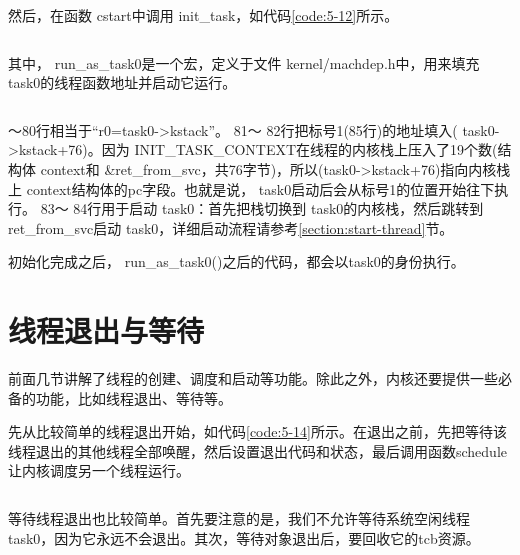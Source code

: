 \documentclass[main.tex]{subfiles}
\begin{document}
\begin{CJK*}{UTF8}{song}
\noindent
然后，在函数 cstart中调用 init\_\-task，如代码\ref{code:5-12}所示。

\begin{code}
\label{code:5-12}
\inputminted[firstline=491,lastline=502,linenos,numbersep=5pt,frame=lines,framesep=2mm]{c}{src/chapter05/kernel/machdep.c}
\end{code}

\noindent
其中， run\_\-as\_\-task0是一个宏，定义于文件 kernel\-/\-machdep.h中，用来填充 task0的线程函数地址并启动它运行。

\begin{code}
\label{code:5-13}
\inputminted[firstline=76,lastline=89,linenos,numbersep=5pt,frame=lines,framesep=2mm]{c}{src/chapter05/kernel/machdep.h}
\end{code}

～80行相当于“r0=task0-\textgreater kstack”。 81～ 82行把标号1(85行)的地址填入( task0-\textgreater kstack+76)。因为 INIT\_\-TASK\_\-CONTEXT在线程的内核栈上压入了19个数(结构体 context和 \&ret\_\-from\_\-svc，共76字节)，所以(task0-\textgreater kstack+76)指向内核栈上 context结构体的pc字段。也就是说， task0启动后会从标号1的位置开始往下执行。 83～ 84行用于启动 task0：首先把栈切换到 task0的内核栈，然后跳转到 ret\_\-from\_\-svc启动 task0，详细启动流程请参考\ref{section:start-thread}节。

\par
初始化完成之后， run\_\-as\_\-task0()之后的代码，都会以task0的身份执行。

\section{线程退出与等待}
前面几节讲解了线程的创建、调度和启动等功能。除此之外，内核还要提供一些必备的功能，比如线程退出、等待等。

\par
先从比较简单的线程退出开始，如代码\ref{code:5-14}所示。在退出之前，先把等待该线程退出的其他线程全部唤醒，然后设置退出代码和状态，最后调用函数schedule让内核调度另一个线程运行。

\begin{code}
\label{code:5-14}
\inputminted[firstline=205,lastline=222,linenos,numbersep=5pt,frame=lines,framesep=2mm]{c}{src/chapter05/kernel/task.c}
\end{code}

等待线程退出也比较简单。首先要注意的是，我们不允许等待系统空闲线程task0，因为它永远不会退出。其次，等待对象退出后，要回收它的tcb资源。


\end{CJK*}
\end{document}
